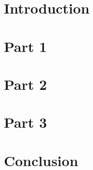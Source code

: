 \documentclass{article}
\begin{document}
\begin{titlepage}

\end{titlepage}
\section{Introduction}

\section{Part 1}

\section{Part 2}

\section{Part 3}

\section{Conclusion}

\end{document}
